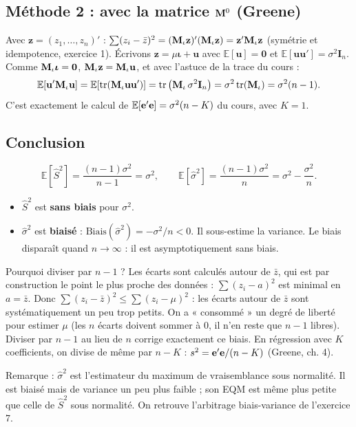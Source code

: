 \documentclass[11pt,a4paper]{article}
\newcommand{\vi}{\bm{\iota}}
\newcommand{\I}{\mathbf{I}}\newcommand{\J}{\mathbf{J}}
\newcommand{\E}{\mathbb{E}}\newcommand{\Var}{\operatorname{Var}}\newcommand{\Cov}{\operatorname{Cov}}
\newcommand{\tr}{\operatorname{tr}}\newcommand{\EQM}{\operatorname{EQM}}
\begin{document}
\subsection*{Méthode 2 : avec la matrice $\mathbf{M}^0$ (Greene)}
Avec $\mathbf z=(z_1,\dots,z_n)'$ : $\sum(z_i-\bar z)^2=(\mathbf{M}_\iota\mathbf z)'(\mathbf{M}_\iota\mathbf z)=\mathbf z'\mathbf{M}_\iota\mathbf z$ (symétrie et idempotence, exercice 1). Écrivons $\mathbf z=\mu\vi+\mathbf u$ avec $\E[\mathbf u]=\mathbf 0$ et $\E[\mathbf u\mathbf u']=\sigma^2\I_n$. Comme $\Mm_\iota\vi=\mathbf 0$, $\mathbf{M}_\iota\mathbf z=\mathbf{M}_\iota\mathbf u$, et avec l'astuce de la trace du cours :
\[
\E[\mathbf u'\Mm_\iota\mathbf u]=\E[\tr(\Mm_\iota\mathbf u\mathbf u')]=\tr\big(\Mm_\iota\,\sigma^2\I_n\big)=\sigma^2\tr(\Mm_\iota)=\sigma^2(n-1).
\]
C'est exactement le calcul de $\E[\ve'\ve]=\sigma^2(n-K)$ du cours, avec $K=1$.

\subsection*{Conclusion}
\[
\E[\hat S^2]=\frac{(n-1)\sigma^2}{n-1}=\sigma^2,
\qquad
\E[\hat\sigma^2]=\frac{(n-1)\sigma^2}{n}=\sigma^2-\frac{\sigma^2}{n}.
\]

\begin{reponse}
\begin{itemize}[nosep]
\item $\hat S^2$ est \textbf{sans biais} pour $\sigma^2$.
\item $\hat\sigma^2$ est \textbf{biaisé} : $\text{Biais}(\hat\sigma^2)=-\sigma^2/n<0$. Il sous-estime la variance. Le biais disparaît quand $n\to\infty$ : il est asymptotiquement sans biais.
\end{itemize}
\end{reponse}

\begin{intuition}
Pourquoi diviser par $n-1$ ? Les écarts sont calculés autour de $\bar z$, qui est par construction le point le plus proche des données : $\sum(z_i-a)^2$ est minimal en $a=\bar z$. Donc $\sum(z_i-\bar z)^2\le\sum(z_i-\mu)^2$ : les écarts autour de $\bar z$ sont systématiquement un peu trop petits. On a « consommé » un degré de liberté pour estimer $\mu$ (les $n$ écarts doivent sommer à 0, il n'en reste que $n-1$ libres). Diviser par $n-1$ au lieu de $n$ corrige exactement ce biais. En régression avec $K$ coefficients, on divise de même par $n-K$ : $s^2=\mathbf{e}'\mathbf{e}/(n-K)$ (Greene, ch. 4).

Remarque : $\hat\sigma^2$ est l'estimateur du maximum de vraisemblance sous normalité. Il est biaisé mais de variance un peu plus faible ; son EQM est même plus petite que celle de $\hat S^2$ sous normalité. On retrouve l'arbitrage biais-variance de l'exercice 7.
\end{intuition}
\end{document}
